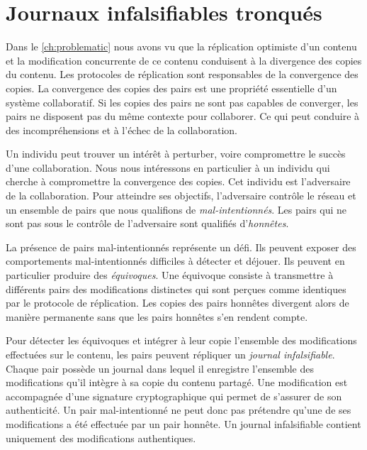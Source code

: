 
\chapter{Journaux infalsifiables tronqués}\label{ch:pruned-log}

\minitoc{}
\clearpage

Dans le \autoref{ch:problematic} nous avons vu que la réplication optimiste d'un contenu et la modification concurrente de ce contenu conduisent à la divergence des copies du contenu.
Les protocoles de réplication sont responsables de la convergence des copies.
La convergence des copies des pairs est une propriété essentielle d'un système collaboratif.
Si les copies des pairs ne sont pas capables de converger, les pairs ne disposent pas du même contexte pour collaborer.
Ce qui peut conduire à des incompréhensions et à l'échec de la collaboration.

Un individu peut trouver un intérêt à perturber, voire compromettre le succès d'une collaboration.
Nous nous intéressons en particulier à un individu qui cherche à compromettre la convergence des copies.
Cet individu est l'adversaire de la collaboration.
Pour atteindre ses objectifs, l'adversaire contrôle le réseau et un ensemble de pairs que nous qualifions de \emph{mal-intentionnés}.
Les pairs qui ne sont pas sous le contrôle de l'adversaire sont qualifiés d'\emph{honnêtes}.

La présence de pairs mal-intentionnés représente un défi.
Ils peuvent exposer des comportements mal-intentionnés difficiles à détecter et déjouer.
Ils peuvent en particulier produire des \emph{équivoques}.
Une équivoque consiste à transmettre à différents pairs des modifications distinctes qui sont perçues comme identiques par le protocole de réplication.
Les copies des pairs honnêtes divergent alors de manière permanente sans que les pairs honnêtes s'en rendent compte.

Pour détecter les équivoques et intégrer à leur copie l'ensemble des modifications effectuées sur le contenu, les pairs peuvent répliquer un \emph{journal infalsifiable}.
Chaque pair possède un journal dans lequel il enregistre l'ensemble des modifications qu'il intègre à sa copie du contenu partagé.
Une modification est accompagnée d'une signature cryptographique qui permet de s'assurer de son authenticité.
Un pair mal-intentionné ne peut donc pas prétendre qu'une de ses modifications a été effectuée par un pair honnête.
Un journal infalsifiable contient uniquement des modifications authentiques.


